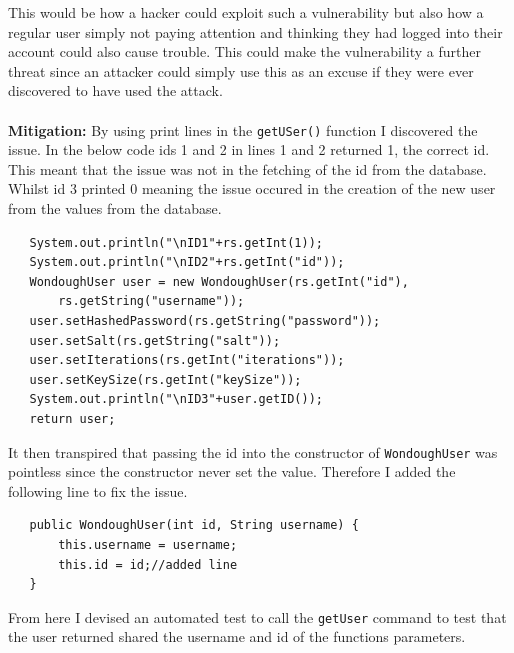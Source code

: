 This would be how a hacker could exploit such a vulnerability but also how a regular user simply not paying attention and thinking they had logged into their account could also
cause trouble. This could make the vulnerability a further threat since an attacker could simply use this as an excuse if they were ever discovered to have used the attack.\\ \\
\textbf{Mitigation:} By using print lines in the \verb|getUSer()| function I discovered the issue. In the below code ids 1 and 2 in lines 1 and 2 returned 1, the correct id. This
meant that the issue was not in the fetching of the id from the database. Whilst id 3 printed 0 meaning the issue occured in the creation of the new user from the values from
the database.
\begin{verbatim}
   System.out.println("\nID1"+rs.getInt(1));
   System.out.println("\nID2"+rs.getInt("id"));
   WondoughUser user = new WondoughUser(rs.getInt("id"),
       rs.getString("username"));
   user.setHashedPassword(rs.getString("password"));
   user.setSalt(rs.getString("salt"));
   user.setIterations(rs.getInt("iterations"));
   user.setKeySize(rs.getInt("keySize"));
   System.out.println("\nID3"+user.getID());
   return user;
\end{verbatim}
It then transpired that passing the id into the constructor of \verb|WondoughUser| was pointless since the constructor never set the value. Therefore I added the following line
to fix the issue.
\begin{verbatim}
   public WondoughUser(int id, String username) {
       this.username = username;
       this.id = id;//added line
   }
\end{verbatim}
From here I devised an automated test to call the \verb|getUser| command to test that the user returned shared the username and id of the functions parameters.